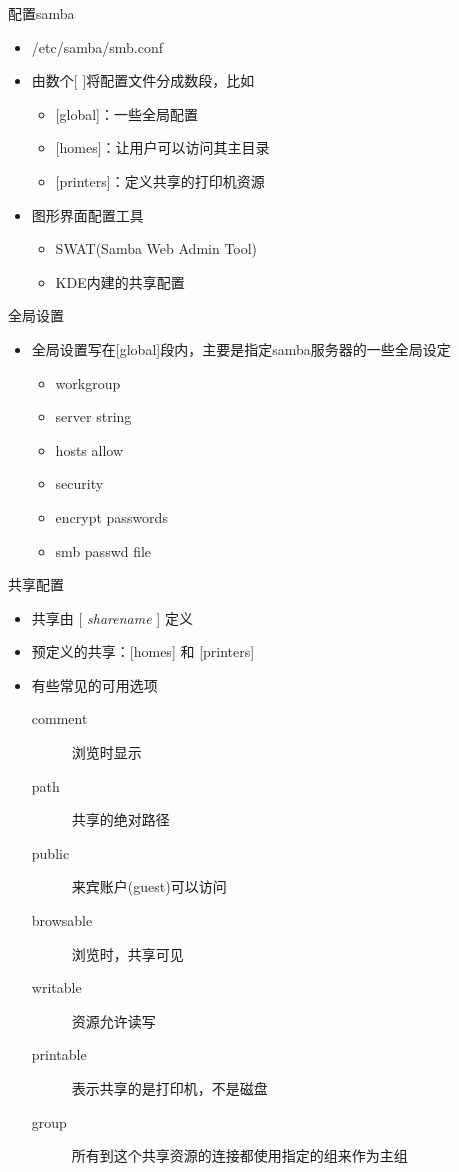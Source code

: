 \begin{frame}{配置samba}
\begin{itemize}
\item /etc/samba/smb.conf
\item 由数个{[} {]}将配置文件分成数段，比如

\begin{itemize}
\item {[}global{]}：一些全局配置
\item {[}homes{]}：让用户可以访问其主目录
\item {[}printers{]}：定义共享的打印机资源
\end{itemize}
\item 图形界面配置工具

\begin{itemize}
\item SWAT(Samba Web Admin Tool)
\item KDE内建的共享配置
\end{itemize}
\end{itemize}

\end{frame} 
\begin{frame}{全局设置}
\begin{itemize}
\item 全局设置写在{[}global{]}段内，主要是指定samba服务器的一些全局设定

\begin{itemize}
\item workgroup
\item server string
\item hosts allow
\item security
\item encrypt passwords
\item smb passwd file
\end{itemize}
\end{itemize}

\end{frame} 
\begin{frame}{共享配置}
\begin{itemize}
\item 共享由 {[}\emph{ sharename} {]} 定义
\item 预定义的共享：{[}homes{]} 和 {[}printers{]}
\item 有些常见的可用选项

\begin{description}
\item [{comment}] 浏览时显示
\item [{path}] 共享的绝对路径
\item [{public}] 来宾账户(guest)可以访问
\item [{browsable}] 浏览时，共享可见
\item [{writable}] 资源允许读写
\item [{printable}] 表示共享的是打印机，不是磁盘
\item [{group}] 所有到这个共享资源的连接都使用指定的组来作为主组
\end{description}
\end{itemize}

\end{frame} 
